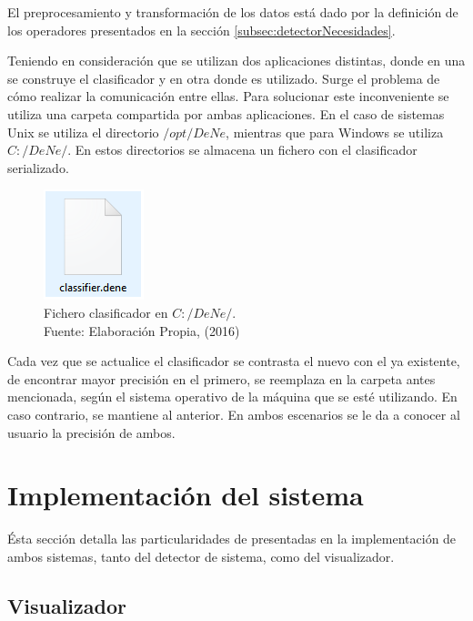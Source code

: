El preprocesamiento y transformación de los datos está dado por la definición de los operadores presentados en la sección \ref{subsec:detectorNecesidades}.

Teniendo en consideración que se utilizan dos aplicaciones distintas, donde en una se construye el clasificador y en otra donde es utilizado. Surge el problema de cómo realizar la comunicación entre ellas. Para solucionar este inconveniente se utiliza una carpeta compartida por ambas aplicaciones. En el caso de sistemas Unix se utiliza el directorio $/opt/DeNe$, mientras que para Windows se utiliza $C:/DeNe/$. En estos directorios se almacena un fichero con el clasificador serializado.

\begin{figure}[H]
	\centering
	\captionsetup{justification=centering}
	\includegraphics[scale=0.8]{images/ClasifierDene.png}
	\caption[Fichero clasificador en $c:/DeNe/$.]{Fichero clasificador en $C:/DeNe/$.\\Fuente: Elaboración Propia, (2016)}
	\label{fig:TopologiaGeneral}
\end{figure}

Cada vez que se actualice el clasificador se contrasta el nuevo con el ya existente, de encontrar mayor precisión en el primero, se reemplaza en la carpeta antes mencionada, según el sistema operativo de la máquina que se esté utilizando. En caso contrario, se mantiene al anterior. En ambos escenarios se le da a conocer al usuario la precisión de ambos.

\section{Implementación del sistema}
\label{sec:implementacion}

Ésta sección detalla las particularidades de presentadas en la implementación de ambos sistemas, tanto del detector de sistema, como del visualizador.

\subsection{Visualizador}
\label{subsec:imp:visualizador}

